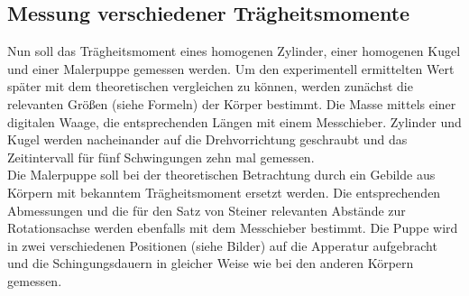 \subsection{Messung verschiedener Trägheitsmomente}
Nun soll das Trägheitsmoment eines homogenen Zylinder, einer homogenen Kugel und einer
Malerpuppe gemessen werden. Um den experimentell ermittelten Wert später mit dem theoretischen
vergleichen zu können, werden zunächst die relevanten Größen (siehe Formeln) der Körper
bestimmt. Die Masse mittels einer digitalen Waage, die entsprechenden Längen mit einem
Messchieber. Zylinder und Kugel werden nacheinander auf die Drehvorrichtung geschraubt und
das Zeitintervall für fünf Schwingungen zehn mal gemessen. \\
Die Malerpuppe soll bei der theoretischen Betrachtung durch ein Gebilde aus Körpern mit
bekanntem Trägheitsmoment ersetzt werden. Die entsprechenden Abmessungen und die für den Satz
von Steiner relevanten Abstände zur Rotationsachse werden ebenfalls mit dem Messchieber bestimmt.
Die Puppe wird in zwei verschiedenen Positionen (siehe Bilder) auf die Apperatur aufgebracht
und die Schingungsdauern in gleicher Weise wie bei den anderen Körpern gemessen. 
